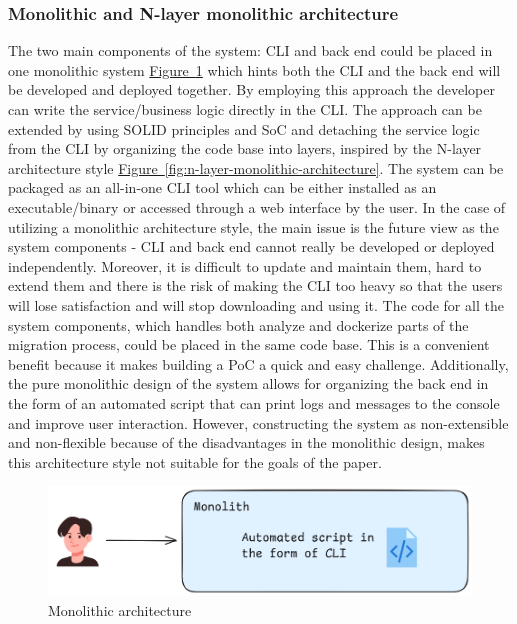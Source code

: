 \documentclass[twocolumn]{article}
\newcommand{\FigRef}[1]{\hyperref[#1]{Figure~\ref{#1}}}
\begin{document}
\subsubsection{Monolithic and N-layer monolithic architecture}
The two main components of the system: CLI and back end could be placed in one monolithic system \FigRef{fig:monolithic-architecture} which hints both the CLI and the back end will be developed and deployed together. By employing this approach the developer can write the service/business logic directly in the CLI. The approach can be extended by using SOLID principles and SoC and detaching the service logic from the CLI by organizing the code base into layers, inspired by the N-layer architecture style \FigRef{fig:n-layer-monolithic-architecture}. The system can be packaged as an all-in-one CLI tool which can be either installed as an executable/binary or accessed through a web interface by the user. In the case of utilizing a monolithic architecture style, the main issue is the future view as the system components - CLI and back end cannot really be developed or deployed independently. Moreover, it is difficult to update and maintain them, hard to extend them and there is the risk of making the CLI too heavy so that the users will lose satisfaction and will stop downloading and using it. The code for all the system components, which handles both analyze and dockerize parts of the migration process, could be placed in the same code base. This is a convenient benefit because it makes building a PoC a quick and easy challenge. Additionally, the pure monolithic design of the system allows for organizing the back end in the form of an automated script that can print logs and messages to the console and improve user interaction. However, constructing the system as non-extensible and non-flexible because of the disadvantages in the monolithic design, makes this architecture style not suitable for the goals of the paper.

\begin{figure}[H]
    \centering
    \includegraphics[width=\linewidth]{images/monolithic-architecture.png}
    \caption{Monolithic architecture}
    \label{fig:monolithic-architecture}
\end{figure}
\end{document}
